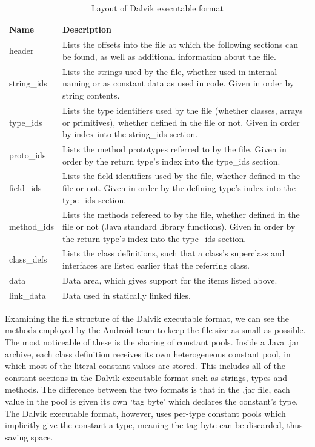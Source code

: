\begin{center}
\begin{table}[htbp]
    \begin{tabular}{ | l | p{10cm} | } \hline
    Name 		& Description \\ \hline
    header		&	Lists the offsets into the file at which the following sections can be found, as well as additional information about the file. \\ \hline
	string\_ids	&	Lists the strings used by the file, whether used in internal naming or as constant data as used in code. Given in order by string contents. \\ \hline
	type\_ids	&	Lists the type identifiers used by the file (whether classes, arrays or primitives), whether defined in the file or not. Given in order by index into the string\_ids section. \\ \hline
	proto\_ids	&	Lists the method prototypes referred to by the file. Given in order by the return type's index into the type\_ids section. \\ \hline
	field\_ids	&	Lists the field identifiers used by the file, whether defined in the file or not. Given in order by the defining type's index into the type\_ids section. \\ \hline
	method\_ids	&	Lists the methods refereed to by the file, whether defined in the file or not (\ie Java standard library functions).
					Given in order by the return type's index into the type\_ids section. \\ \hline
	class\_defs	&	Lists the class definitions, such that a class's superclass and interfaces are listed earlier that the referring class. \\ \hline
	data		&	Data area, which gives support for the items listed above. \\ \hline
	link\_data	&	Data used in statically linked files. \\ \hline
    \end{tabular}
    
    \caption{Layout of Dalvik executable format}
    \label{tab:dalvik_layout}
\end{table}
\end{center}

Examining the file structure of the Dalvik executable format, we can see the methods employed by the Android team to keep the file size as small as possible. The most noticeable of these is the sharing of constant pools. Inside a Java .jar archive, each class definition receives its own heterogeneous constant pool, in which most of the literal constant values are stored. This includes all of the constant sections in the Dalvik executable format such as strings, types and methods. The difference between the two formats is that in the .jar file, each value in the pool is given its own `tag byte' which declares the constant's type. The Dalvik executable format, however, uses per-type constant pools which implicitly give the constant a type, meaning the tag byte can be discarded, thus saving space.

